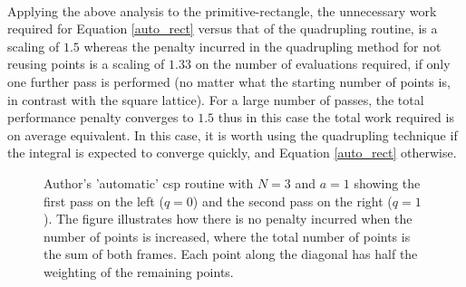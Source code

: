 \documentclass[a4paper, 12pt]{article}
\begin{document}
	\\\par Applying the above analysis to the primitive-rectangle, the unnecessary work required for Equation \eqref{auto_rect} versus that of the quadrupling routine, is a scaling of $1.5$ whereas the penalty incurred in the quadrupling method for not reusing points is a scaling of $1.33$ on the number of evaluations required, if only one further pass is performed (no matter what the starting number of points is, in contrast with the square lattice). For a large number of passes, the total performance penalty converges to $1.5$ thus in this case the total work required is on average equivalent. In this case, it is worth using the quadrupling technique if the integral is expected to converge quickly, and Equation \eqref{auto_rect} otherwise.
\pgfplotsset{width=3in}
\pgfplotsset{height=3in}
	\tikzset{external/export next=false}
\begin{figure}[H]
\caption{\footnotesize
	Author's 'automatic' \acrfull{csp} routine with $N = 3$ and $a=1$ showing the first pass on the left ($q=0$) and the second pass on the right ($q=1$). The figure illustrates how there is no penalty incurred when the number of points is increased, where the total number of points is the sum of both frames. Each point along the diagonal has half the weighting of the remaining points.}
\end{figure}
\end{document}
